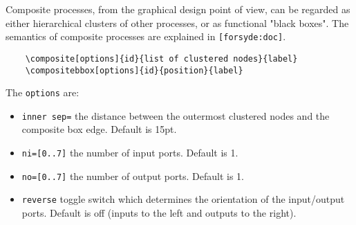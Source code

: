 \documentclass[10pt]{article}
\begin{document}
Composite processes, from the graphical design point of view, can be regarded as either hierarchical clusters of other processes, or as functional "black boxes". The semantics of composite processes are explained in \texttt{[forsyde:doc]}.

\begin{verbatim}
	\composite[options]{id}{list of clustered nodes}{label}
	\compositebbox[options]{id}{position}{label}
\end{verbatim}

The \texttt{options} are:
\begin{itemize}
\item\texttt{inner sep=} the distance between the outermost clustered nodes and the composite box edge. Default is 15pt.
\item \texttt{ni=[0..7]} the number of input ports. Default is 1.
\item \texttt{no=[0..7]} the number of output ports. Default is 1.
\item\texttt{reverse} toggle switch which determines the orientation of the input/output ports. Default is off (inputs to the left and outputs to the right).
\end{itemize}
\end{document}
